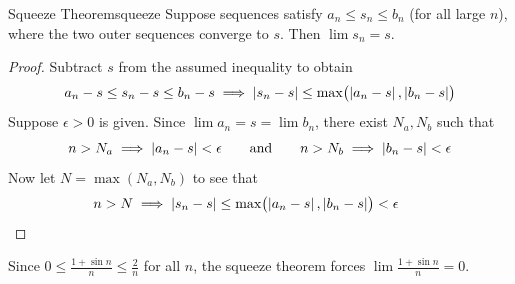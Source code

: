 

\goodbreak


\begin{thm}{Squeeze Theorem}{squeeze}
	Suppose sequences satisfy $a_n\le s_n\le b_n$ (for all large $n$), where the two outer sequences converge to $s$. Then $\lim s_n=s$.
\end{thm}

\begin{proof}
	Subtract $s$ from the assumed inequality to obtain
	\[
		a_n-s\le s_n-s\le b_n-s
		\implies\left| s_n-s\right|\le\max\bigl(\left| a_n-s\right|,\left| b_n-s\right|\bigr)
	\]
	Suppose $\epsilon>0$ is given. Since $\lim a_n=s=\lim b_n$, there exist $N_a,N_b$ such that
	\[
		n>N_a\implies \left| a_n-s\right|<\epsilon
		\qquad\text{and}\qquad 
		n>N_b\implies \left| b_n-s\right|<\epsilon
	\]
	Now let $N=\max(N_a,N_b)$ to see that
	\[
		n>N\implies \left| s_n-s\right|\le\max\bigl(\left| a_n-s\right|,\left| b_n-s\right|\bigr)<\epsilon \tag*{\qedhere}
	\]
\end{proof}


\begin{example}{}{}
	Since $0\le \frac{1+\sin n}n\le \frac 2n$ for all $n$, the squeeze theorem forces $\lim \frac{1+\sin n}n=0$.
\end{example}


\medskip


